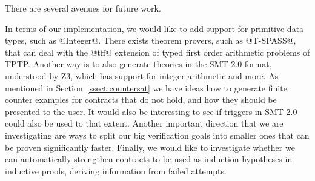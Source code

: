 
There are several avenues for future work. 

In terms of our implementation, we would like 
to add support for primitive data types, such as @Integer@. There exists
theorem provers, such as @T-SPASS@, that can deal with the @tff@ extension 
of typed first order arithmetic problems of TPTP. Another way is to also 
generate theories in the SMT 2.0 format, understood by Z3, which has support 
for integer arithmetic and more. As mentioned in Section~\ref{ssect:countersat} 
we have ideas how to generate finite counter examples for contracts that do not 
hold, and how they should be presented to the user. It would also be interesting 
to see if triggers in SMT 2.0 could also be used to that extent. Another important 
direction that we are investigating are ways to split our big verification goals
into smaller ones that can be proven significantly faster. Finally, we would like
to investigate whether we can automatically strengthen contracts to be used as 
induction hypotheses in inductive proofs, deriving information from failed attempts.

